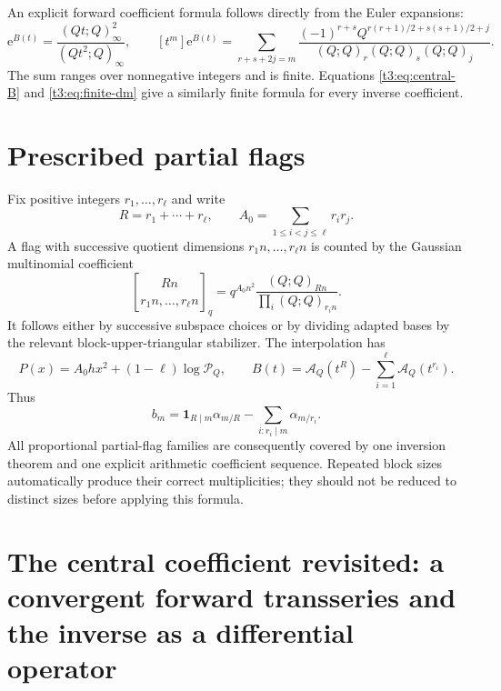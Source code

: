 \documentclass[11pt,openany]{book}
\numberwithin{equation}{chapter}
\theoremstyle{plain}
\theoremstyle{definition}
\theoremstyle{remark}
\newcommand{\ee}{\mathrm e}
\newcommand{\pp}[1]{(Q;Q)_{#1}}
\newcommand{\Pinf}{\mathcal P_Q}
\newcommand{\A}{\mathcal A_Q}
\newcommand{\one}{\mathbf 1}
\begin{document}
An explicit forward coefficient formula follows directly from the Euler expansions:
\begin{equation}\label{t3:eq:central-forward}
 \ee^{B(t)}=\frac{(Qt;Q)_\infty^2}{(Qt^2;Q)_\infty},\qquad
 [t^m]\ee^{B(t)}=
 \sum_{r+s+2j=m}
 \frac{(-1)^{r+s}Q^{r(r+1)/2+s(s+1)/2+j}}
 {\pp{r}\pp{s}\pp{j}}.
\end{equation}
The sum ranges over nonnegative integers and is finite. Equations \eqref{t3:eq:central-B} and \eqref{t3:eq:finite-dm} give a similarly finite formula for every inverse coefficient.

\section{Prescribed partial flags}

Fix positive integers $r_1,\ldots,r_\ell$ and write
\[
 R=r_1+\cdots+r_\ell,\qquad
 A_0=\sum_{1\le i<j\le\ell}r_i r_j.
\]
A flag with successive quotient dimensions $r_1n,\ldots,r_\ell n$ is counted by the Gaussian multinomial coefficient
\begin{equation}\label{t3:eq:multinomial}
 \genfrac{[}{]}{0pt}{}{Rn}{r_1n,\ldots,r_\ell n}_q
 =q^{A_0n^2}\frac{\pp{Rn}}{\prod_i\pp{r_i n}}.
\end{equation}
It follows either by successive subspace choices or by dividing adapted bases by the relevant block-upper-triangular stabilizer. The interpolation has
\begin{equation}\label{t3:eq:partialflag-phase}
 P(x)=A_0hx^2+(1-\ell)\log\Pinf,
 \qquad
 B(t)=\A(t^R)-\sum_{i=1}^{\ell}\A(t^{r_i}).
\end{equation}
Thus
\begin{equation}\label{t3:eq:partialflag-b}
 b_m=\one_{R\mid m}\alpha_{m/R}
     -\sum_{i:r_i\mid m}\alpha_{m/r_i}.
\end{equation}
All proportional partial-flag families are consequently covered by one inversion theorem and one explicit arithmetic coefficient sequence. Repeated block sizes automatically produce their correct multiplicities; they should not be reduced to distinct sizes before applying this formula.

\section{The central coefficient revisited: a convergent forward transseries and the inverse as a differential operator}
\label{ct:sec:gauss-t1}
\end{document}
